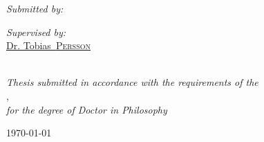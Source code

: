 \begin{titlepage}
\begin{center}
\begin{minipage}[t]{0.4\textwidth}
\begin{flushleft} \large
\emph{Submitted by:}\\
\href{https://orcid.org/my-orcid?orcid=0000-0001-8012-1440}{\authorname} %
\end{flushleft}
\end{minipage}
\begin{minipage}[t]{0.4\textwidth}
\begin{flushright} \large
\emph{Supervised by:}\\
\href{https://www.researchgate.net/profile/Tobias-Persson}{Dr. Tobias~\textsc{Persson}}\\
\href{https://orcid.org/0000-0001-7085-0973}{\supname}\\
\end{flushright}
\end{minipage}

\vspace{1.5cm}

\vfill

\large \textit{Thesis submitted in accordance with the requirements of the\\}
\univname, \deptname \\
\large \textit{for the degree of Doctor in Philosophy}

\vfill

{\large \today}\\[4.5cm] %

\vfill
\end{center}
\end{titlepage}